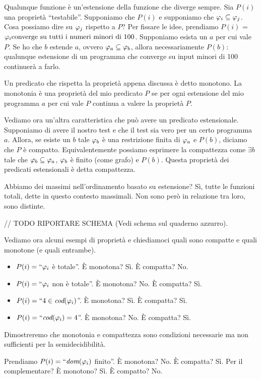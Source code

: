 Qualunque funzione è un'estensione della funzione che diverge sempre. Sia $P(i)$ una proprietà
``testabile''. Supponiamo che $P(i)$ e supponiamo che $\varphi_{i} \subseteq \varphi_{j}$. Cosa possiamo dire su
$\varphi_{j}$ rispetto a $P$? Per fissare le idee, prendiamo $P(i)$ = $\varphi_{i} \text{converge su tutti i
numeri minori di 100}$. Supponiamo esista un $a$ per cui vale $P$. Se ho che $b$ estende $a$, ovvero
$\varphi_{a} \subseteq \varphi_{b}$, allora necessariamente $P(b)$: qualunque estensione di un programma che
converge su input minori di 100 continuerà a farlo.

Un predicato che rispetta la proprietà appena discussa è detto monotono. La monotonia è una
proprietà del mio predicato $P$ se per ogni estensione del mio programma $a$ per cui vale $P$
continua a valere la proprietà $P$. 

Vediamo ora un'altra caratteristica che può avere un predicato estensionale. Supponiamo di avere il
nostro test e che il test sia vero per un certo programma $a$. Allora, se esiste un $b$ tale $\varphi_{b}$ è
una restrizione finita di $\varphi_{a}$ e $P(b)$, diciamo che $P$ è compatto. Equivalentemente possiamo
esprimere la compattezza come $\exists b$ tale che $\varphi_{b} \subseteq \varphi_{a}$, $\varphi_{b}$ è finito (come grafo)
e $P(b)$. Questa proprietà dei predicati estensionali è detta compattezza.

Abbiamo dei massimi nell'ordinamento basato su estensione? Sì, tutte le funzioni totali, dette in
questo contesto massimali. Non sono però in relazione tra loro, sono distinte.

// TODO RIPORTARE SCHEMA
(Vedi schema sul quaderno azzurro).

Vediamo ora alcuni esempi di proprietà e chiediamoci quali sono compatte e quali monotone (e quali
entrambe).
\begin{itemize}
    \item $P(i) = ``\varphi_{i}$ è totale''. È monotona? Sì. È compatta? No.
    \item $P(i) = ``\varphi_{i}$ non è totale''. È monotona? No. È compatta? Sì.
    \item $P(i) = ``4 \in \textit{cod}(\varphi_{i})$''. È monotona? Sì. È compatta? Sì.
    \item $P(i) = ``\textit{cod}(\varphi_{i}) = {4}$''. È monotona? No. È compatta? Sì.
\end{itemize}

Dimostreremo che monotonia e compattezza sono condizioni necessarie ma non sufficienti per la
semidecidibilità.

Prendiamo $P(i) = ``\textit{dom}(\varphi_{i})$ finito''. È monotona? No. È compatta? Sì. Per il complementare? È
monotono? Sì. È compatto? No.

